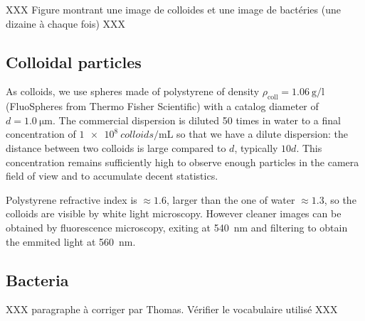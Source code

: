 \documentclass[%
 aip,
 jmp,%
 amsmath,amssymb,
reprint,%
]{revtex4-1}
\begin{document}
XXX Figure montrant une image de colloides et une image de bactéries (une dizaine à chaque fois) XXX

\subsection{Colloidal particles}

As colloids, we use spheres made of polystyrene of density $\rho_\text{coll} = \SI{1.06}{\gram\per\litre}$ (FluoSpheres\circledR{} from Thermo Fisher Scientific) with a catalog diameter of $d = \SI{1.0}{\micro\meter}$. The commercial dispersion is diluted 50 times in water to a final concentration of $\SI{1e8}{colloids\per\milli\liter}$ so that we have a dilute dispersion: the distance between two colloids is large compared to $d$, typically $10 d$. This concentration remains sufficiently high to observe enough particles in the camera field of view and to accumulate decent statistics.

Polystyrene refractive index is $\approx 1.6$, larger than the one of water $\approx 1.3$, so the colloids are visible by white light microscopy. However cleaner images can be obtained by fluorescence microscopy, exiting at \SI{540}{\nano\metre} and filtering to obtain the emmited light at \SI{560}{\nano\metre}.


\subsection{Bacteria}

XXX paragraphe à corriger par Thomas. Vérifier le vocabulaire utilisé XXX
\end{document}
